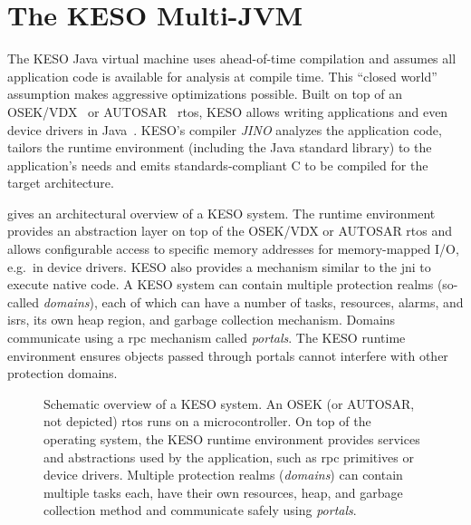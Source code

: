 	\section{The KESO Multi-JVM}
		\label{sec:intro:keso}
		The KESO Java virtual machine uses ahead-of-time compilation and assumes all application code is available for
		analysis at compile time. This \enquote{closed world} assumption makes aggressive optimizations possible. Built on
		top of an OSEK/VDX~\cite{OSEKSpec223} or AUTOSAR~\cite{autosar:06:sws_os} \gls{rtos}, KESO allows writing
		applications and even device drivers in Java~\cite{thomm:10:jtres}. KESO's compiler \emph{JINO} analyzes the
		application code, tailors the runtime environment (including the Java standard library) to the application's needs
		and emits standards-compliant C to be compiled for the target architecture.

		 gives an architectural overview of a KESO system. The runtime environment provides an
		abstraction layer on top of the OSEK/VDX or AUTOSAR \gls{rtos} and allows configurable access to specific memory
		addresses for memory-mapped I/O, e.g.\ in device drivers. KESO also provides a mechanism similar to the \gls{jni} to
		execute native code. A KESO system can contain multiple protection realms (so-called \emph{domains}), each of which
		can have a number of tasks, resources, alarms, and \glspl{isr}, its own heap region, and garbage collection
		mechanism. Domains communicate using a \gls{rpc} mechanism called \emph{portals}. The KESO runtime environment
		ensures objects passed through portals cannot interfere with other protection domains.

		\begin{figure}
			\begin{center}
				
			\end{center}
			\caption[Schematic overview of a KESO system]{%
				Schematic overview of a KESO system. An OSEK (or AUTOSAR, not depicted) \gls{rtos} runs on a microcontroller. On
				top of the operating system, the KESO runtime environment provides services and abstractions used by the
				application, such as \gls{rpc} primitives or device drivers. Multiple protection realms (\emph{domains}) can
				contain multiple tasks each, have their own resources, heap, and garbage collection method and communicate
				safely using \emph{portals}.}
			\label{fig:intro:overview}
		\end{figure}

